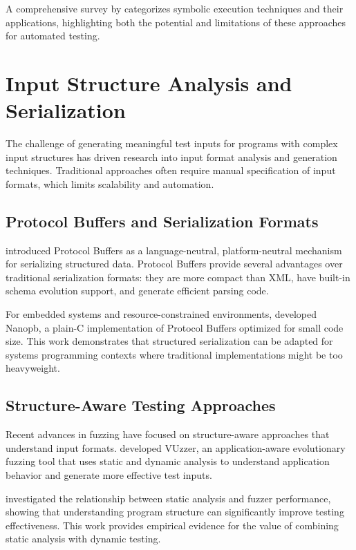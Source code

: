 \documentclass[doublespace,nopageskip]{VTthesis} %
\begin{document}
    A comprehensive survey by \citet{baldoni2018survey} categorizes symbolic execution techniques and their applications, highlighting both the potential and limitations of these approaches for automated testing.
    
    \section{Input Structure Analysis and Serialization} \label{se:input_structure}
    
    The challenge of generating meaningful test inputs for programs with complex input structures has driven research into input format analysis and generation techniques. Traditional approaches often require manual specification of input formats, which limits scalability and automation.
    
    \subsection{Protocol Buffers and Serialization Formats}
    
    \citet{protobuf2024} introduced Protocol Buffers as a language-neutral, platform-neutral mechanism for serializing structured data. Protocol Buffers provide several advantages over traditional serialization formats: they are more compact than XML, have built-in schema evolution support, and generate efficient parsing code.
    
    For embedded systems and resource-constrained environments, \citet{nanopb2024} developed Nanopb, a plain-C implementation of Protocol Buffers optimized for small code size. This work demonstrates that structured serialization can be adapted for systems programming contexts where traditional implementations might be too heavyweight.
    
    \subsection{Structure-Aware Testing Approaches}
    
    Recent advances in fuzzing have focused on structure-aware approaches that understand input formats. \citet{rawat2017vuzzer} developed VUzzer, an application-aware evolutionary fuzzing tool that uses static and dynamic analysis to understand application behavior and generate more effective test inputs.
    
    \citet{wang2024understanding} investigated the relationship between static analysis and fuzzer performance, showing that understanding program structure can significantly improve testing effectiveness. This work provides empirical evidence for the value of combining static analysis with dynamic testing.
    
\end{document}
